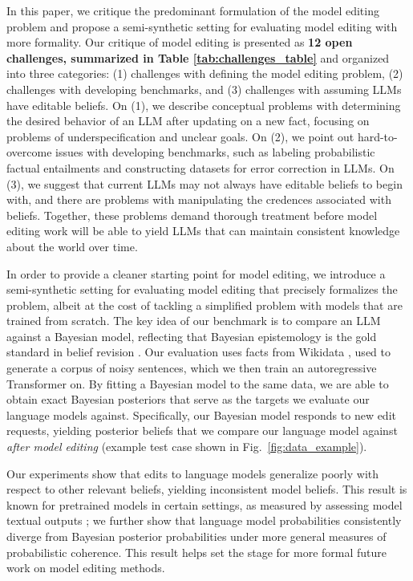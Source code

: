 \documentclass[11pt,a4paper]{article}
\begin{document}
In this paper, we critique the predominant formulation of the model editing problem and propose a semi-synthetic setting for evaluating model editing with more formality. Our critique of model editing is presented as \textbf{12 open challenges, summarized in Table \ref{tab:challenges_table}} and organized into three categories: (1) challenges with defining the model editing problem, (2)  challenges with developing benchmarks, and (3) challenges with assuming LLMs have editable beliefs.
On (1), we describe conceptual problems with determining the desired behavior of an LLM after updating on a new fact, focusing on problems of underspecification and unclear goals. On (2), we point out hard-to-overcome issues with developing benchmarks, such as labeling probabilistic factual entailments and constructing datasets for error correction in LLMs. On (3), we suggest that current LLMs may not always have editable beliefs to begin with, and there are problems with manipulating the credences associated with beliefs.
Together, these problems demand thorough treatment before model editing work will be able to yield LLMs that can maintain consistent knowledge about the world over time.

In order to provide a cleaner starting point for model editing, we introduce a semi-synthetic setting for evaluating model editing that precisely formalizes the problem, albeit at the cost of tackling a simplified problem with models that are trained from scratch. 
The key idea of our benchmark is to compare an LLM against a Bayesian model, reflecting that Bayesian epistemology is the gold standard in belief revision \citep{sep-epistemology-bayesian}.
Our evaluation uses facts from Wikidata \citep{vrandevcic2014wikidata}, used to generate a corpus of noisy sentences, which we then train an autoregressive Transformer on. By fitting a Bayesian model to the same data, we are able to obtain exact Bayesian posteriors that serve as the targets we evaluate our language models against. Specifically, our Bayesian model responds to new edit requests, yielding posterior beliefs that we compare our language model against \emph{after model editing} (example test case shown in Fig.~\ref{fig:data_example}). 

Our experiments show that edits to language models generalize poorly with respect to other relevant beliefs, yielding inconsistent model beliefs. This result is known for pretrained models in certain settings, as measured by assessing model textual outputs \citep{zhong2023mquake, cohen2024evaluating}; we further show that language model probabilities consistently diverge from Bayesian posterior probabilities under more general measures of probabilistic coherence.
This result helps set the stage for more formal future work on model editing methods.
\end{document}
